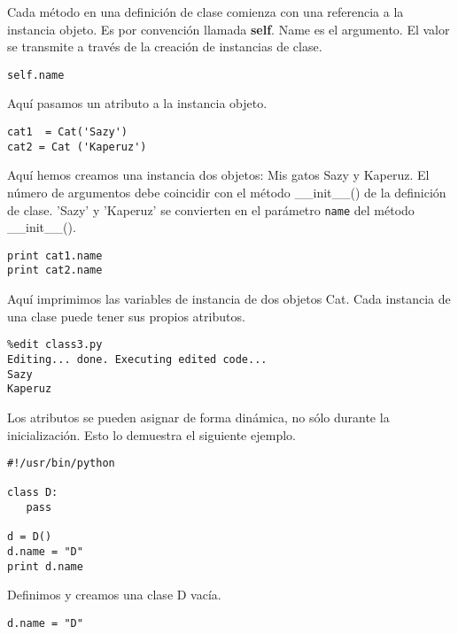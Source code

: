 \documentclass[twoside,10.5pt]{article}%
\begin{document}
\vspace{0.3cm}

Cada m\'etodo en una definici\'on de clase comienza con una referencia a la  instancia objeto. Es por convenci\'on llamada \textbf{self}. Name  es el argumento. El valor se transmite a trav\'es de la creaci\'on de instancias de clase.


\begin{verbatim}
self.name
\end{verbatim}

Aqu\'i pasamos un atributo a la instancia objeto.

\begin{verbatim}
cat1  = Cat('Sazy')
cat2 = Cat ('Kaperuz')
\end{verbatim}

\vspace{0.3cm}

Aqu\'i hemos creamos una instancia dos objetos: Mis gatos Sazy y Kaperuz. El n\'umero de argumentos debe coincidir con el m\'etodo  {\color{red}\_\_init\_\_()} de la definici\'on de clase. 'Sazy' y  'Kaperuz' se convierten en el par\'ametro \texttt{name}  del m\'etodo {\color{red}\_\_init\_\_()}.



\begin{verbatim}
print cat1.name
print cat2.name
\end{verbatim}

Aqu\'i imprimimos las variables de instancia de dos objetos Cat. Cada instancia de una clase puede tener sus propios atributos.


\begin{verbatim}
%edit class3.py
Editing... done. Executing edited code...
Sazy
Kaperuz
\end{verbatim}

Los atributos se pueden asignar de forma din\'amica, no s\'olo durante la inicializaci\'on. Esto lo demuestra el siguiente ejemplo.

\begin{verbatim}
#!/usr/bin/python

class D:
   pass

d = D()
d.name = "D"
print d.name
\end{verbatim}

Definimos y creamos una clase D vac\'ia.

\begin{verbatim}
d.name = "D"
\end{verbatim}
\end{document}
